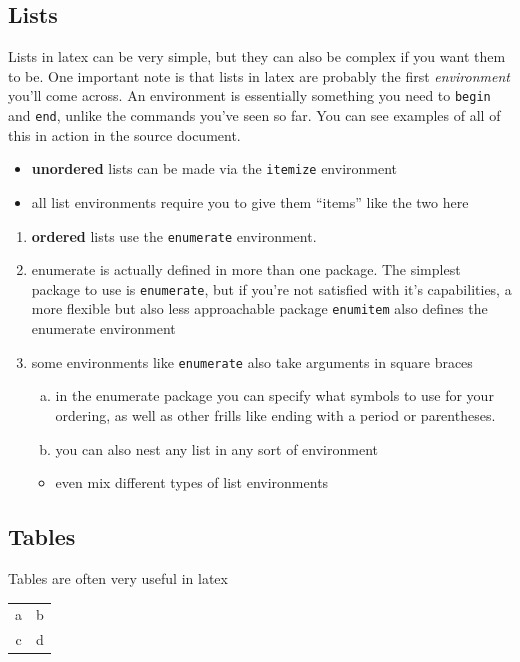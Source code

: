 \documentclass{article}
\begin{document}
\subsection*{Lists}
Lists in latex can be very simple, but they can also be complex if you want
them to be. One important note is that lists in latex are probably the first
\textit{environment} you'll come across. An environment is essentially something
you need to \lstinline{begin} and \lstinline{end}, unlike the commands you've
seen so far. You can see examples of all of this in action in the source
document.

\begin{itemize}
\item \textbf{unordered} lists can be made via the \lstinline{itemize}
      environment
\item all list environments require you to give them \enquote{items} like the
      two here
\end{itemize}

\begin{enumerate}[1.]
\item \textbf{ordered} lists use the \lstinline{enumerate} environment.

\item enumerate is actually defined in more than one package. The simplest
      package to use is \lstinline{enumerate}, but if you're not satisfied
      with it's capabilities, a more flexible but also less approachable
      package \lstinline{enumitem} also defines the enumerate environment

\item some environments like \lstinline{enumerate} also take arguments in
      square braces
      \begin{enumerate}[(a)]
      \item in the enumerate package you can specify what symbols to use for
            your ordering, as well as other frills like ending with a period
            or parentheses.
      \item you can also nest any list in any sort of environment
      \end{enumerate}
      \begin{itemize}
      \item even mix different types of list environments
      \end{itemize}
\end{enumerate}

\subsection*{Tables}
Tables are often very useful in latex
\begin{tabular}{cc}
a & b\\
c & d\\
\end{tabular}
\end{document}
